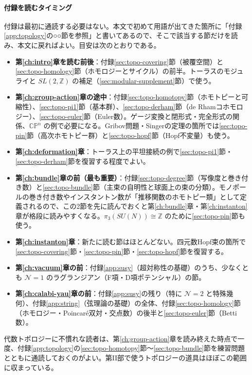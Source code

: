\documentclass[uplatex, dvipdfmx, book]{jsbook}
\begin{document}
\paragraph{付録を読むタイミング}
付録は最初に通読する必要はない。本文で初めて用語が出てきた箇所に「付録\ref{app:topology}の○○節を参照」と書いてあるので、そこで該当する節だけを読み、本文に戻ればよい。目安は次のとおりである。
\begin{itemize}
    \item \textbf{第\ref{ch:intro}章を読む前後}：付録\ref{sec:topo-covering}節（被覆空間）と\ref{sec:topo-homology}節（ホモロジーとサイクル）の前半。トーラスのモジュライと $SL(2,\mathbb{Z})$ の補足（\ref{sec:modular-supplement}節）で使う。
    \item \textbf{第\ref{ch:group-action}章の途中}：付録\ref{sec:topo-homotopy}節（ホモトピーと可縮性）、\ref{sec:topo-pi1}節（基本群）、\ref{sec:topo-derham}節（de Rhamコホモロジー）、\ref{sec:topo-euler}節（Euler数）。ゲージ変換と閉形式・完全形式の関係、$\mathbb{CP}^n$ の例で必要になる。Gribov問題・Singerの定理の箇所では\ref{sec:topo-pin}節（高次ホモトピー群）と\ref{sec:topo-hopf}節（Hopf不変量）も使う。
    \item \textbf{第\ref{ch:deformation}章}：トーラス上の平坦接続の例で\ref{sec:topo-pi1}節・\ref{sec:topo-derham}節を復習する程度でよい。
    \item \textbf{第\ref{ch:bundle}章の前（最も重要）}：付録\ref{sec:topo-degree}節（写像度と巻き付き数）と\ref{sec:topo-bundle}節（主束の自明性と球面上の束の分類）。モノポールの巻き付き数やインスタントン数が「推移関数のホモトピー類」として定義されるので、この2節を先に読んでおくと第\ref{ch:bundle}章・第\ref{ch:instanton}章が格段に読みやすくなる。$\pi_3(SU(N))\cong\mathbb{Z}$ のために\ref{sec:topo-pin}節も使う。
    \item \textbf{第\ref{ch:instanton}章}：新たに読む節はほとんどない。四元数Hopf束の箇所で\ref{sec:topo-covering}節・\ref{sec:topo-pin}節・\ref{sec:topo-hopf}節を復習する。
    \item \textbf{第\ref{ch:vacuum}章の前}：付録\ref{app:susy}（超対称性の基礎）のうち、少なくとも $\mathcal{N}=1$ のラグランジアン（F項・D項ポテンシャル）の節。
    \item \textbf{第\ref{ch:calabi-yau}章の前}：付録\ref{app:susy}の残り（特に $\mathcal{N}=2$ と特殊幾何）、付録\ref{app:string}（弦理論の基礎）の全体、付録\ref{sec:topo-homology}節（ホモロジー・Poincar\'e双対・交点数）の後半と\ref{sec:topo-euler}節（Betti数）。
\end{itemize}
代数トポロジーに不慣れな読者は、第\ref{ch:group-action}章を読み終えた時点で一度、付録\ref{app:topology}の\ref{sec:topo-homotopy}節〜\ref{sec:topo-bundle}節を練習問題とともに通読しておくのがよい。第II部で使うトポロジーの道具はほぼこの範囲に収まっている。
\end{document}
